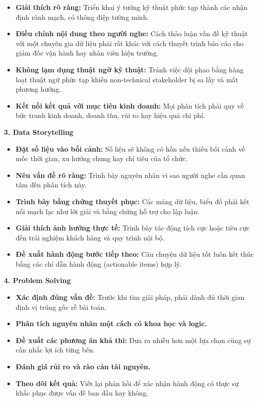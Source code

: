 \begin{itemize}
\tightlist
\item
  \textbf{Giải thích rõ ràng:} Triển khai ý tưởng kỹ thuật phức tạp
  thành các nhận định rành mạch, có thông điệp tường minh.
\item
  \textbf{Điều chỉnh nội dung theo người nghe:} Cách thảo luận vấn đề kỹ
  thuật với một chuyên gia dữ liệu phải rất khác với cách thuyết trình
  báo cáo cho giám đốc vận hành hay nhân viên hiện trường.
\item
  \textbf{Không lạm dụng thuật ngữ kỹ thuật:} Tránh việc dội phao bằng
  hàng loạt thuật ngữ phức tạp khiến non-technical stakeholder bị sa lầy
  và mất phương hướng.
\item
  \textbf{Kết nối kết quả với mục tiêu kinh doanh:} Mọi phân tích phải
  quy về bức tranh kinh doanh, doanh thu, rủi ro hay hiệu quả chi phí.
\end{itemize}

\vspace{0.5em}\noindent\textbf{3. Data Storytelling}\par

\begin{itemize}
\tightlist
\item
  \textbf{Đặt số liệu vào bối cảnh:} Số liệu sẽ không có hồn nếu thiếu
  bối cảnh về mốc thời gian, xu hướng chung hay chỉ tiêu của tổ chức.
\item
  \textbf{Nêu vấn đề rõ ràng:} Trình bày nguyên nhân vì sao người nghe
  cần quan tâm đến phân tích này.
\item
  \textbf{Trình bày bằng chứng thuyết phục:} Các mảng dữ liệu, biểu đồ
  phải kết nối mạch lạc như lời giải và bằng chứng hỗ trợ cho lập luận.
\item
  \textbf{Giải thích ảnh hưởng thực tế:} Trình bày tác động tích cực
  hoặc tiêu cực đến trải nghiệm khách hàng và quy trình nội bộ.
\item
  \textbf{Đề xuất hành động bước tiếp theo:} Câu chuyện dữ liệu tốt luôn
  kết thúc bằng các chỉ dẫn hành động (actionable items) hợp lý.
\end{itemize}

\vspace{0.5em}\noindent\textbf{4. Problem Solving}\par

\begin{itemize}
\tightlist
\item
  \textbf{Xác định đúng vấn đề:} Trước khi tìm giải pháp, phải dành đủ
  thời gian định vị trúng gốc rễ bài toán.
\item
  \textbf{Phân tích nguyên nhân một cách có khoa học và logic.}
\item
  \textbf{Đề xuất các phương án khả thi:} Đưa ra nhiều hơn một lựa chọn
  cùng sự cân nhắc lợi ích từng bên.
\item
  \textbf{Đánh giá rủi ro và rào cản tài nguyên.}
\item
  \textbf{Theo dõi kết quả:} Viết lại phản hồi để xác nhận hành động có
  thực sự khắc phục được vấn đề ban đầu hay không.
\end{itemize}

